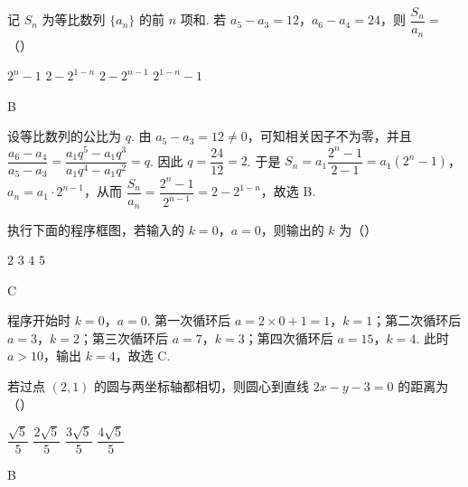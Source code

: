 \begin{problem}
记 \(S_n\) 为等比数列 \(\{a_n\}\) 的前 \(n\) 项和. 若 \(a_5-a_3=12\)，\(a_6-a_4=24\)，则 \(\dfrac{S_n}{a_n}=\)（\quad）

\choices
    {\(2^n-1\)}
    {\(2-2^{1-n}\)}
    {\(2-2^{n-1}\)}
    {\(2^{1-n}-1\)}
\end{problem}

\begin{answer}
B
\end{answer}

\begin{solution}
设等比数列的公比为 \(q\). 由 \(a_5-a_3=12\ne0\)，可知相关因子不为零，并且
\(\dfrac{a_6-a_4}{a_5-a_3}=\dfrac{a_1q^5-a_1q^3}{a_1q^4-a_1q^2}=q\). 因此 \(q=\dfrac{24}{12}=2\). 于是
\(S_n=a_1\dfrac{2^n-1}{2-1}=a_1(2^n-1)\)，\(a_n=a_1\cdot2^{n-1}\)，从而 \(\dfrac{S_n}{a_n}=\dfrac{2^n-1}{2^{n-1}}=2-2^{1-n}\)，故选 B.
\end{solution}

\begin{problem}
执行下面的程序框图，若输入的 \(k=0\)，\(a=0\)，则输出的 \(k\) 为（\quad）


\choices
    {\(2\)}
    {\(3\)}
    {\(4\)}
    {\(5\)}
\end{problem}

\begin{answer}
C
\end{answer}

\begin{solution}
程序开始时 \(k=0\)，\(a=0\). 第一次循环后 \(a=2\times0+1=1\)，\(k=1\)；第二次循环后 \(a=3\)，\(k=2\)；第三次循环后 \(a=7\)，\(k=3\)；第四次循环后 \(a=15\)，\(k=4\). 此时 \(a>10\)，输出 \(k=4\)，故选 C.
\end{solution}

\begin{problem}
若过点 \((2,1)\) 的圆与两坐标轴都相切，则圆心到直线 \(2x-y-3=0\) 的距离为（\quad）

\choices
    {\(\dfrac{\sqrt5}{5}\)}
    {\(\dfrac{2\sqrt5}{5}\)}
    {\(\dfrac{3\sqrt5}{5}\)}
    {\(\dfrac{4\sqrt5}{5}\)}
\end{problem}

\begin{answer}
B
\end{answer}

